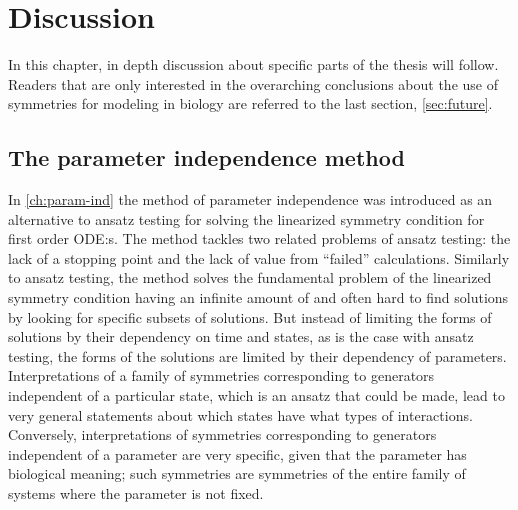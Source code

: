 \chapter{Discussion}

In this chapter, in depth discussion about specific parts of the thesis will follow.
Readers that are only interested in the overarching conclusions about the use of symmetries for modeling in biology are referred to the last section, \cref{sec:future}.

\section{The parameter independence method}

In \cref{ch:param-ind} the method of parameter independence was introduced as an alternative to ansatz testing for solving the linearized symmetry condition for first order ODE:s.
The method tackles two related problems of ansatz testing: the lack of a stopping point and the lack of value from \enquote{failed} calculations.
Similarly to ansatz testing, the method solves the fundamental problem of the linearized symmetry condition having an infinite amount of and often hard to find solutions by looking for specific subsets of solutions.
But instead of limiting the forms of solutions by their dependency on time and states, as is the case with ansatz testing, the forms of the solutions are limited by their dependency of parameters.
Interpretations of a family of symmetries corresponding to generators independent of a particular state, which is an ansatz that could be made, lead to very general statements about which states have what types of interactions.
Conversely, interpretations of symmetries corresponding to generators independent of a parameter are very specific, given that the parameter has biological meaning; such symmetries are symmetries of the entire family of systems where the parameter is not fixed.


